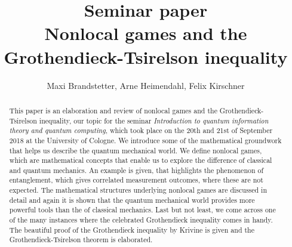 

\title{Seminar paper \\ Nonlocal games and the Grothendieck-Tsirelson inequality}
\author{Maxi Brandstetter, Arne Heimendahl, Felix Kirschner}





\begin{abstract}
This paper is an elaboration and review of nonlocal games and the Grothendieck-Tsirelson inequality, our topic for the seminar \emph{Introduction to quantum information theory and quantum computing}, which took place on the 20th and 21st of September 2018 at the University of Cologne. We introduce some of the mathematical groundwork that helps us describe the quantum mechanical world. We define nonlocal games, which are mathematical concepts that enable us to explore the difference of classical and quantum mechanics. An example is given, that highlights the phenomenon of entanglement, which gives correlated measurement outcomes, where these are not expected. The mathematical structures underlying nonlocal games are discussed in detail and again it is shown that the quantum mechanical world provides more powerful tools than the of classical mechanics. Last but not least, we come across one of the many instances where the celebrated Grothendieck inequality comes in handy. The beautiful proof of the Grothendieck inequality by Krivine is given and the Grothendieck-Tsirelson theorem is elaborated. 
\end{abstract}


\maketitle	
\newpage
\tableofcontents
	
	
\newpage	
{}



	\vspace{8pt}
%	


